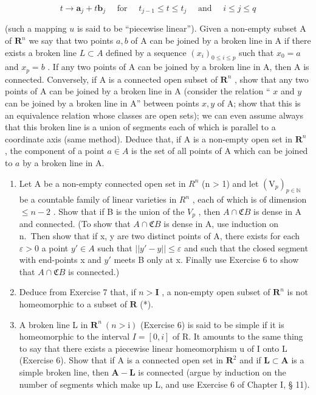 \[
t \rightarrow \boldsymbol {a} _ {j} + t \boldsymbol {b} _ {j} \quad \text { for } \quad t _ {j - 1} \leqslant t \leqslant t _ {j} \quad \text { and } \quad i \leqslant j \leqslant q
\]

(such a mapping \(u\) is said to be ``piecewise linear''). Given a non-empty subset A of \(\mathbf{R}^n\) we say that two points \(a, b\) of A can be joined by a broken line in A if there exists a broken line \(L \subset A\) defined by a sequence \((x_i)_{0 \leqslant i \leqslant p}\) such that \(x_0 = a\) and \(x_p = b\) . If any two points of A can be joined by a broken line in A, then A is connected. Conversely, if A is a connected open subset of \(\mathbf{R}^n\) , show that any two points of A can be joined by a broken line in A (consider the relation `` \(x\) and \(y\) can be joined by a broken line in A'' between points \(x, y\) of A; show that this is an equivalence relation whose classes are open sets); we can even assume always that this broken line is a union of segments each of which is parallel to a coordinate axis (same method). Deduce that, if A is a non-empty open set in \(\mathbf{R}^n\) , the component of a point \(a \in A\) is the set of all points of A which can be joined to \(a\) by a broken line in A.

\begin{enumerate}
\def\labelenumi{\arabic{enumi})}
\setcounter{enumi}{6}
\item
  Let A be a non-empty connected open set in \(R^{n}\) (n \textgreater{} 1) and let \((\mathrm{V}_{p})_{p \in \mathbb{N}}\) be a countable family of linear varieties in \(R^{n}\) , each of which is of dimension \(\leqslant n - 2\) . Show that if B is the union of the \(V_{p}\) , then \(A \cap \mathfrak{C}B\) is dense in A and connected. (To show that \(A \cap \mathfrak{C}B\) is dense in A, use induction on n.~Then show that if x, y are two distinct points of A, there exists for each \(\varepsilon > 0\) a point \(y' \in A\) such that \(||y' - y|| \leqslant \varepsilon\) and such that the closed segment with end-points x and \(y'\) meets B only at x. Finally use Exercise 6 to show that \(A \cap \mathfrak{C}B\) is connected.)
\item
  Deduce from Exercise 7 that, if \(n > \mathbf{I}\) , a non-empty open subset of \(\mathbf{R}^n\) is not homeomorphic to a subset of \(\mathbf{R}\) (*).
\item
  A broken line L in \(\mathbf{R}^{n}\ (n > \mathrm{i})\) (Exercise 6) is said to be simple if it is homeomorphic to the interval \(I = [0, i]\) of R. It amounts to the same thing to say that there exists a piecewise linear homeomorphism u of I onto L (Exercise 6). Show that if A is a connected open set in \(\mathbf{R}^2\) and if \(\mathbf{L}\subset\mathbf{A}\) is a simple broken line, then \(\mathbf{A}-\mathbf{L}\) is connected (argue by induction on the number of segments which make up L, and use Exercise 6 of Chapter I, § 11).
\end{enumerate}

